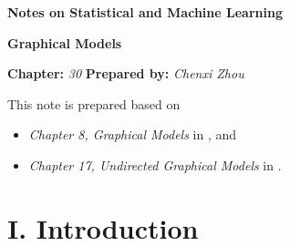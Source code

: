 \documentclass[12pt]{article}
\newcommand{\titlebox}[4]{
\begin{tcolorbox}[colback = blue!5!white!95, colframe = blue!70!black
]
  \noindent \textbf{ #1 } \hfill \textit{#2} 
  \begin{center}
  	 \LARGE{\textbf{#3}}
  \end{center}
\textbf{Chapter:} \textit{#4} \hfill \textbf{Prepared by:} \textit{Chenxi Zhou}
\end{tcolorbox}
}
\begin{document}
\titlebox{Notes on Statistical and Machine Learning}{}{Graphical Models}{30}
\thispagestyle{plain}

\vspace{10pt}

This note is prepared based on 
\begin{itemize}
	\item \textit{Chapter 8, Graphical Models} in \textcite{Bishop2016-tm}, and 
	\item \textit{Chapter 17, Undirected Graphical Models} in \textcite{Friedman2001-np}. 
\end{itemize}


\section*{I. Introduction} 
\end{document}

